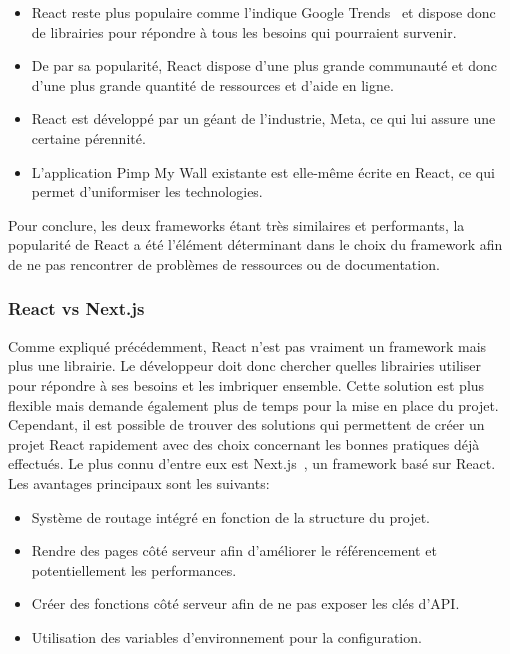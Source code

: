 \begin{itemize}
  \item React reste plus populaire comme l'indique Google Trends~\cite{google-trends-js-frameworks} et dispose donc de librairies pour répondre à tous les besoins qui pourraient survenir.
  \item De par sa popularité, React dispose d'une plus grande communauté et donc d'une plus grande quantité de ressources et d'aide en ligne.
  \item React est développé par un géant de l'industrie, Meta, ce qui lui assure une certaine pérennité.
  \item L'application Pimp My Wall existante est elle-même écrite en React, ce qui permet d'uniformiser les technologies.
\end{itemize}

Pour conclure, les deux frameworks étant très similaires et performants, la popularité de React a été l'élément déterminant dans le choix du framework afin de ne pas rencontrer de problèmes de ressources ou de documentation.

\subsubsection{React vs Next.js}

Comme expliqué précédemment, React n'est pas vraiment un framework mais plus une librairie. Le développeur doit donc chercher quelles librairies utiliser pour répondre à ses besoins et les imbriquer ensemble. Cette solution est plus flexible mais demande également plus de temps pour la mise en place du projet. Cependant, il est possible de trouver des solutions qui permettent de créer un projet React rapidement avec des choix concernant les bonnes pratiques déjà effectués. Le plus connu d'entre eux est Next.js~\cite{nextjs}, un framework basé sur React. Les avantages principaux sont les suivants:

\begin{itemize}
  \item Système de routage intégré en fonction de la structure du projet.
  \item Rendre des pages côté serveur afin d'améliorer le référencement et potentiellement les performances.
  \item Créer des fonctions côté serveur afin de ne pas exposer les clés d'API.
  \item Utilisation des variables d'environnement pour la configuration.
\end{itemize}

